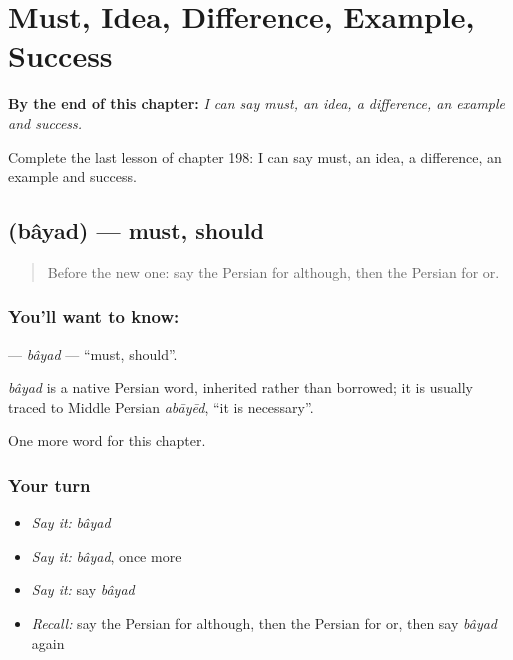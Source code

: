 
\chapter{Must, Idea, Difference, Example, Success}
\label{ch:fa-must-idea-difference-example-success}

\begin{chapteropening}
\textbf{By the end of this chapter:} \emph{I can say must, an idea, a difference, an example and success.}

Complete the last lesson of chapter 198: I can say must, an idea, a difference, an example and success.
\end{chapteropening}

\section[\texorpdfstring{\fa{باید} (bâyad)}{باید (bâyad)}]{ (bâyad) — must, should}

\label{lesson:FA-C198-bayad}



\begin{quote}
Before the new one: say the Persian for although, then the Persian for or.
\end{quote}

\subsection*{You'll want to know: }
\textbf{} — \emph{bâyad} — \textquotedblleft{}must, should\textquotedblright{}.

\begin{cousinweb}
\emph{bâyad} is a native Persian word, inherited rather than borrowed; it is usually traced to Middle Persian \emph{abāyēd}, \textquotedblleft{}it is necessary\textquotedblright{}.
\end{cousinweb}

\begin{grammarlens}[title={What you've built}]
One more word for this chapter.
\end{grammarlens}

\subsection*{Your turn}
\begin{itemize}
\raggedright
  \item \emph{Say it:} \emph{bâyad}
  \item \emph{Say it:} \emph{bâyad}, once more
  \item \emph{Say it:} say \emph{bâyad}
  \item \emph{Recall:} say the Persian for although, then the Persian for or, then say \emph{bâyad} again
\end{itemize}

